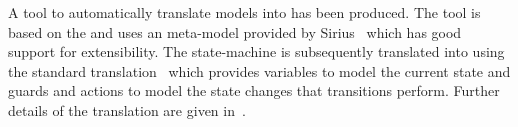 



A tool to automatically translate \SCXML models into \UMLB has been produced. 
The tool is based on the \EMF and uses an \SCXML meta-model provided by Sirius~\cite{siriuswebsite} which has good support for extensibility. 
The \UMLB state-machine is subsequently translated into \EVENTB using the standard \UMLB translation~\cite{snook14:iumlbStatem} which provides variables to model the current state and guards and actions to model the state changes that transitions perform. Further details of the translation are given in~\cite{MoSn16,MoSnHo18,MoSnHo-ABZ2020}.

